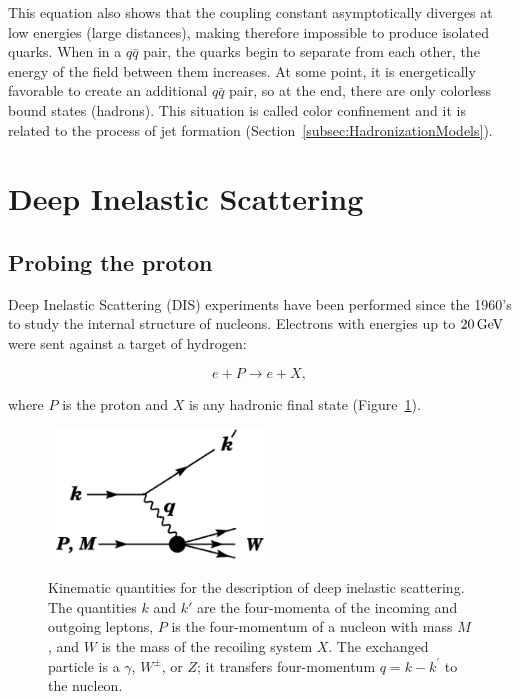 This equation also shows that the coupling constant asymptotically diverges at low energies (large distances), making therefore impossible to produce isolated quarks.
When in a $q\bar{q}$ pair, the quarks begin to separate from each other, the energy of the field between them increases.
At some point, it is energetically favorable to create an additional $q\bar{q}$ pair, so at the end, there are only colorless bound states (hadrons).
This situation is called color confinement and it is related to the process of jet formation (Section~\ref{subsec:HadronizationModels}).


\section{Deep Inelastic Scattering}
    \label{sec:DIS}

\subsection{Probing the proton}
    \label{subsec:ProvingProton}

Deep Inelastic Scattering (DIS) experiments have been performed since the 1960's to study the internal structure of nucleons.
Electrons with energies up to $\unit[20]{GeV}$ were sent against a target of hydrogen:

\begin{equation}
e + P \rightarrow e + X,
\label{eq:DISschema}
\end{equation}

\noindent where $P$ is the proton and $X$ is any hadronic final state (Figure~\ref{fig:DISexample}).

\begin{figure}[!t]
  \begin{center}
    \mbox{
        \includegraphics[width=0.495\textwidth]{StandardModel/Figures/DISexample.eps}
    }
  \end{center}
  \caption[Kinematic quantities for the description of the Deep Inelastic scattering.]{Kinematic quantities for the description of deep inelastic scattering. The quantities $k$ and $k'$ are the four-momenta of the incoming and outgoing leptons, $P$ is the four-momentum of a nucleon with mass $M$, and $W$ is the mass of the recoiling system $X$. The exchanged particle is a $\gamma$, $W^{\pm}$, or $Z$; it transfers four-momentum $q = k - k^{\prime}$ to the nucleon. \protect\cite{Beringer:1900zz}}
  \label{fig:DISexample}
\end{figure}

